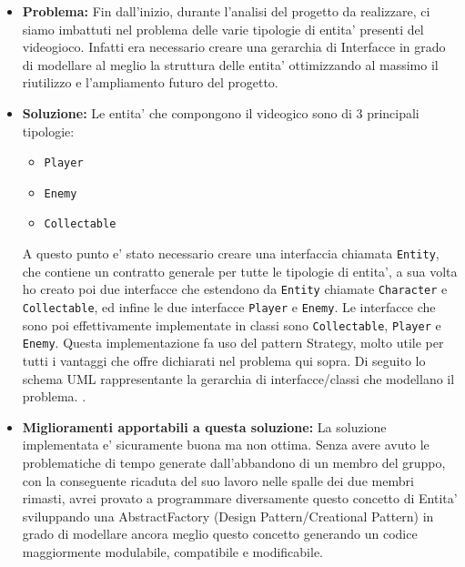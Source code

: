 \documentclass[a4paper,12pt]{report}
\begin{document}
\begin{itemize}
    \item \textbf{Problema:} Fin dall'inizio, durante l'analisi del progetto da realizzare, ci siamo imbattuti nel problema delle varie tipologie di entita' presenti del videogioco. Infatti era necessario creare una gerarchia di Interfacce in grado di modellare al meglio la struttura delle entita' ottimizzando al massimo il riutilizzo e l'ampliamento futuro del progetto.
    \item \textbf{Soluzione:} Le entita' che compongono il videogico sono di 3 principali tipologie: 
    \begin{itemize}
        \item \verb|Player|
        \item \verb|Enemy|
        \item \verb|Collectable|
    \end{itemize}
    A questo punto e' stato necessario creare una interfaccia chiamata \verb|Entity|, che contiene un contratto generale per tutte le tipologie di entita', a sua volta ho creato poi due interfacce che estendono da \verb|Entity| chiamate \verb|Character| e \verb|Collectable|, ed infine le due interfacce \verb|Player| e \verb|Enemy|. Le interfacce che sono poi effettivamente implementate in classi sono \verb|Collectable|, \verb|Player| e \verb|Enemy|. Questa implementazione fa uso del pattern Strategy, molto utile per tutti i vantaggi che offre dichiarati nel problema qui sopra. Di seguito lo schema UML rappresentante la gerarchia di interfacce/classi che modellano il problema. .
    \item \textbf{Miglioramenti apportabili a questa soluzione:} La soluzione implementata e' sicuramente buona ma non ottima. Senza avere avuto le problematiche di tempo generate dall'abbandono di un membro del gruppo, con la conseguente ricaduta del suo lavoro nelle spalle dei due membri rimasti, avrei provato a programmare diversamente questo concetto di Entita' sviluppando una AbstractFactory (Design Pattern/Creational Pattern) in grado di modellare ancora meglio questo concetto generando un codice maggiormente modulabile, compatibile e modificabile.
    \begin{figure}[H]
        \centering{}

\end{figure}
\end{itemize}
\end{document}
